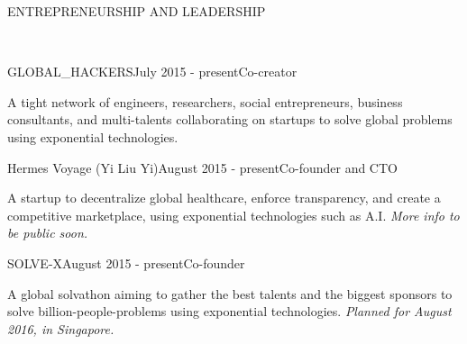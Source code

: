 \documentclass{resume} %
\begin{document}
\begin{rSection}{ENTREPRENEURSHIP AND LEADERSHIP}

{\setlength{\parskip}{1.8pt}
\

\begin{rSubsection}{GLOBAL\_HACKERS}{July 2015 - present}{Co-creator}{}
\item A tight network of engineers, researchers, social entrepreneurs, business consultants, and multi-talents collaborating on startups to solve global problems using exponential technologies.
\end{rSubsection}


\begin{rSubsection}{Hermes Voyage (Yi Liu Yi)}{August 2015 - present}{Co-founder and CTO}{}
\item A startup to decentralize global healthcare, enforce transparency, and create a competitive marketplace, using exponential technologies such as A.I. {\em More info to be public soon.}
\end{rSubsection}


\begin{rSubsection}{SOLVE-X}{August 2015 - present}{Co-founder}{}
\item A global solvathon aiming to gather the best talents and the biggest sponsors to solve billion-people-problems using exponential technologies. {\em Planned for August 2016, in Singapore.}
\end{rSubsection}



}
\end{rSection}

\end{document}
